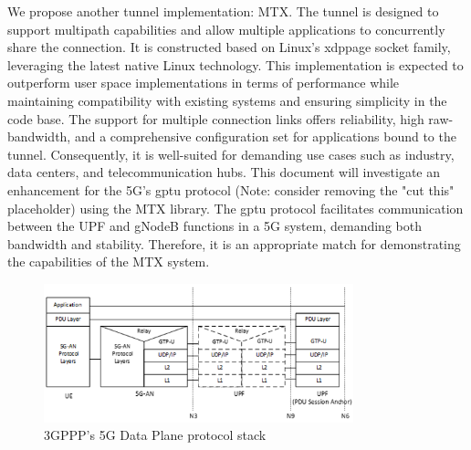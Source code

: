 %
We propose another tunnel implementation: \ac{MTX}. 
The tunnel is designed to support multipath capabilities and allow multiple applications to concurrently share the connection. 
It is constructed based on Linux's \ac{xdppage} socket family, leveraging the latest native Linux technology. 
This implementation is expected to outperform user space implementations in terms of performance while maintaining compatibility with existing systems and ensuring simplicity in the code base.
The support for multiple connection links offers reliability, high raw-bandwidth, and a comprehensive configuration set for applications bound to the tunnel. 
Consequently, it is well-suited for demanding use cases such as industry, data centers, and telecommunication hubs.
This document will investigate an enhancement for the 5G's \ac{gptu} protocol (Note: consider removing the "cut this" placeholder) using the \ac{MTX} library. 
The \ac{gptu} protocol facilitates communication between the UPF and gNodeB functions in a 5G system, demanding both bandwidth and stability. 
Therefore, it is an appropriate match for demonstrating the capabilities of the \ac{MTX} system. 
%

\begin{figure}[H]
	\centering
	\includegraphics[width=0.8\textwidth]{resources/images/3gpp_5g_data_plane_protocol.png}
	\caption{3GPPP's 5G Data Plane protocol stack \cite{3gpp_5g_system_overview}}
    \label{fig:introduction:3gpp_5g_data_plane_protocol}
\end{figure}


